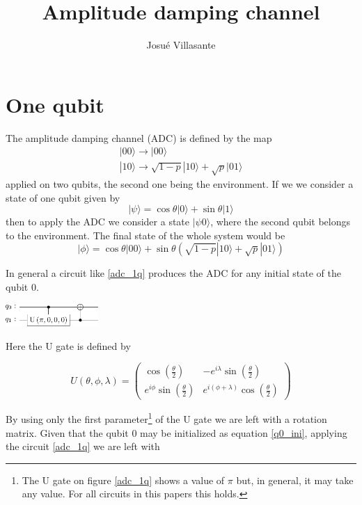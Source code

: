 \documentclass[a4paper, onecolumn]{article}
\author{Josué Villasante}
\title{Amplitude damping channel}
\begin{document}
	\maketitle

	\section{One qubit}
		The amplitude damping channel (ADC) is defined by the map \cite{yugra_constraints_2022}
		$$
		\begin{gathered}
			|00\rangle \rightarrow|00\rangle \\
			|10\rangle \rightarrow \sqrt{1-p}|10\rangle+\sqrt{p}|01\rangle
		\end{gathered}
		$$
		applied on two qubits, the second one being the environment. If we we consider a state of one qubit given by
		\begin{equation}
			|\psi\rangle = \cos\theta|0\rangle + \sin\theta|1\rangle
		\label{q0_ini}
		\end{equation}
		then to apply the ADC we consider a state $|\psi0\rangle$, where the second qubit belongs to the environment. The final state of the whole system would be
		$$
		|\phi\rangle = \cos\theta|00\rangle + 
					   \sin\theta(\sqrt{1-p}|10\rangle + \sqrt{p}|01\rangle)
		$$

		In general a circuit like \ref{adc_1q} produces the ADC for any initial state of the qubit 0.

		\begin{center}
			\includegraphics[width=100pt]{img/adc_1q.png}
			\label{adc_1q}
		\end{center}

		Here the U gate is defined \cite{Qiskit} by

		$$
		U(\theta, \phi, \lambda)=\left(\begin{array}{cc}
		\cos \left(\frac{\theta}{2}\right) & -e^{i \lambda} \sin \left(\frac{\theta}{2}\right) \\
		e^{i \phi} \sin \left(\frac{\theta}{2}\right) & e^{i(\phi+\lambda)} \cos \left(\frac{\theta}{2}\right)
		\end{array}\right)
		$$

		By using only the first parameter\footnote{The U gate on figure \ref{adc_1q} shows a value of $\pi$ but, in general, it may take any value. For all circuits in this papers this holds.} of the U gate we are left with a rotation matrix. Given that the qubit 0 may be initialized as equation \ref{q0_ini}, applying the circuit \ref{adc_1q} we are left with
\end{document}
